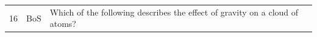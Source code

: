 \documentclass[10pt]{article}
\begin{document}
\begin{tiny}
\begin{longtable}{r p{0.3in} p{1.212in} p{3.8in}}
    16 &          BoS &                                                                                                                                                                                                      Which of the following describes the effect of gravity on a cloud of atoms? &                                                                                                                                                                                                                                                                                                                                                                                                                                                                                                                                                                                                                                                                                                                                                                                                                                                                                                                                                                                                                                                                                                                                                                                                                                                                                                                                                                                                                                                                                                                                                                                                                                                                                                                                                                                                                                                                                                                                                                                                                                                                                                                                                                                                                                                                                                                                                                                                                                                                                                                                                                                                                                                                                                                                                                                                                                                                                                                                                                                                                                                                                               
\end{longtable}
\end{tiny}
\end{document}
